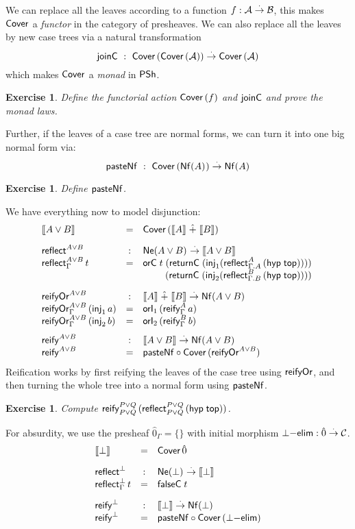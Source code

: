 \documentclass[a4paper]{article}
\newtheorem{exercise}[theorem]{Exercise}
\begin{document}
We can replace all the leaves according to a function $f : \A \todot \B$,
this makes $\tCover$ a \emph{functor} in the category of presheaves.  We can
also replace all the leaves by new case trees via a natural transformation
\[
   \tjoinC ~:~ \Cover{\Cover\A} \todot \Cover\A
\]
which makes $\tCover$ a \emph{monad} in $\PSh$.
\begin{exercise}
  Define the functorial action $\Cover f$ and $\tjoinC$ and prove the
  monad laws.
\end{exercise}
Further, if the leaves of a case tree are normal forms, we can turn it into one big
normal form via:
\[
  \tpasteNf ~:~ \Cover{\Nf A} \todot \Nf A
\]
\begin{exercise}
  Define $\tpasteNf$.
\end{exercise}

\noindent
We have everything now to model disjunction:
\[
\begin{array}{lcl}
\den{A \lor B} & = & \Cover{\den A \hatplus \den B}
\\[2ex]
\treflect^{A \lor B} & : & \Ne{A \lor B} \todot \den{A \lor B} \\
\reflect[\Gamma]{A \lor B}t & = & \orC t
  {(\returnCP {\injP1 {\reflect[\Gamma.A]A{(\hyp \ttop)}}})}
  {\\ && \qquad\ (\returnCP {\injP2 {\reflect[\Gamma.B]B{(\hyp \ttop)}}})}
\\[2ex]
\treifyOr^{A \lor B} & : & \den{A} \hatplus \den{B} \todot \Nf{A \lor B} \\
\reifyOr[\Gamma]{A \lor B}(\inj1\, a) & = & \orIP1 {\reify[\Gamma]A a} \\
\reifyOr[\Gamma]{A \lor B}(\inj2\, b) & = & \orIP2 {\reify[\Gamma]B b}
\\[1.5ex]
\treify^{A \lor B} & : & \den{A \lor B} \todot \Nf{A \lor B} \\
\treify^{A \lor B} & = & \tpasteNf \comp \Cover{\treifyOr^{A \lor B}} \\
\end{array}
\]
Reification works by first reifying the leaves of the case tree using
$\treifyOr$, and then turning the whole tree into a normal form using $\tpasteNf$.
\begin{exercise}
  Compute $\reify[P \lor Q]{P \lor Q} (\reflect[P \lor Q]{P \lor Q}
  (\hyp \ttop))$.
\end{exercise}
For absurdity, we use the presheaf $\hat0_\Gamma = \{\}$ with initial
morphism $\botelim : \hat0 \todot \C$.
\[
\begin{array}{lcl}
\den{\bot} & = & \tCover\,{\hat0}
\\[2ex]
\treflect^{\bot} & : & \Ne{\bot} \todot \den{\bot} \\
\reflect[\Gamma]{\bot}t & = & \falseC t
\\[2ex]
\treify^{\bot} & : & \den{\bot} \todot \Nf{\bot} \\
\treify^{\bot} & = & \tpasteNf \comp \Cover{\botelim} \\
\end{array}
\]
\end{document}
